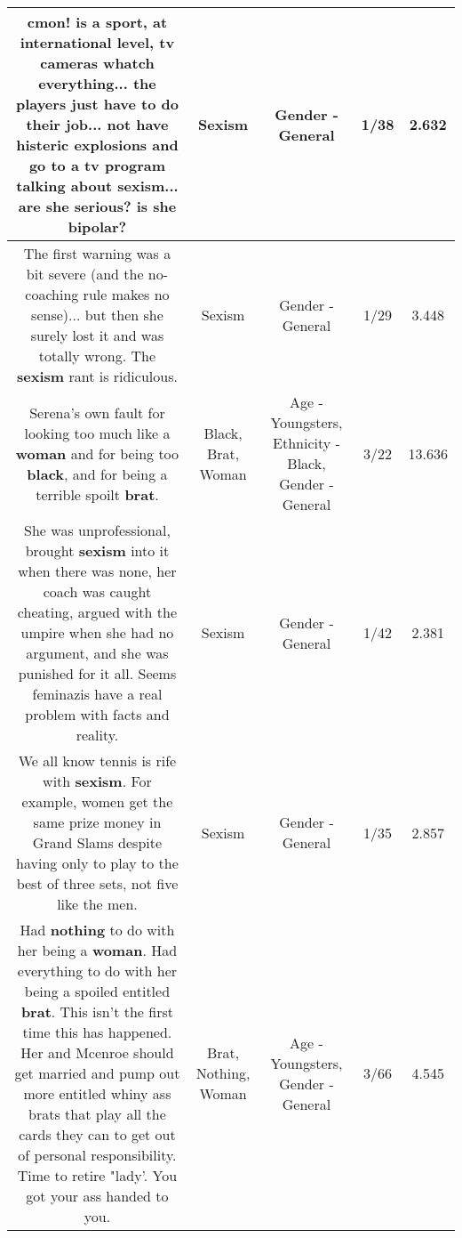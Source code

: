 \documentclass[11pt]{article}
\newlength\mylength
\begin{document}
\begin{center}
\begin{longtable}{|C{.65\mylength}|C{.30\mylength}|C{.12\mylength}|C{.12\mylength}|C{.12\mylength}|}
  \small cmon! is a sport, at international level, tv cameras whatch everything... the players just have to do their job... not have histeric explosions and go to a tv program talking about \textbf{sexism}... are she serious? is she bipolar?\normalsize   & Sexism & Gender - General & 1/38 & 2.632 \\  \hline
  \small The first warning was a bit severe (and the no-coaching rule makes no sense)... but then she surely lost it and was totally wrong. The \textbf{sexism} rant is ridiculous.\normalsize   & Sexism & Gender - General & 1/29 & 3.448 \\  \hline
  \small Serena's own fault for looking too much like a \textbf{woman} and for being too \textbf{black}, and for being a terrible spoilt \textbf{brat}.\normalsize   & Black, Brat, Woman & Age - Youngsters, Ethnicity - Black, Gender - General & 3/22 & 13.636 \\  \hline
  \small She was unprofessional, brought \textbf{sexism} into it when there was none, her coach was caught cheating, argued with the umpire when she had no argument, and she was punished for it all. Seems feminazis have a real problem with facts and reality.\normalsize   & Sexism & Gender - General & 1/42 & 2.381 \\  \hline
  \small We all know tennis is rife with \textbf{sexism}. For example, women get the same prize money in Grand Slams despite having only to play to the best of three sets, not five like the men.\normalsize   & Sexism & Gender - General & 1/35 & 2.857 \\  \hline
  \small Had \textbf{nothing} to do with her being a \textbf{woman}. Had everything to do with her being a spoiled entitled \textbf{brat}.  This isn't the first time this has happened.  Her and Mcenroe should get married and pump out more entitled whiny ass brats that play all the cards they can to get out of personal responsibility. Time to retire "lady'.  You got your ass handed to you.\normalsize   & Brat, Nothing, Woman & Age - Youngsters, Gender - General & 3/66 & 4.545 \\  \hline

\end{longtable}
\end{center}
\end{document}
